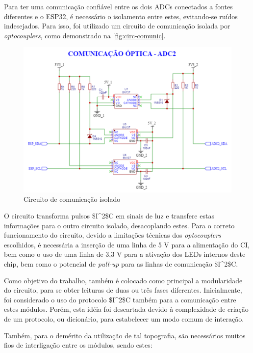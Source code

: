 Para ter uma comunicação confiável entre os dois \gls{ADC}s conectados a fontes diferentes e o ESP32, é necessário o isolamento entre estes, evitando-se ruídos indesejados. Para isso, foi utilizado um circuito de comunicação isolada por \textit{optocouplers}, como demonstrado na \autoref{fig:circ-comunic}.

\begin{figure}[htb!]
    \caption{Circuito de comunicação isolado}
    \label{fig:circ-comunic}
    \includegraphics[width=1.0\textwidth]{figuras/circ-comunic.png}
    \fonte{}
\end{figure}

O circuito transforma pulsos \gls{$I^2$C} em sinais de luz e transfere estas informações para o outro circuito isolado, desacoplando estes. Para o correto funcionamento do circuito, devido a limitações técnicas dos \textit{optocouplers} escolhidos, é necessária a inserção de uma linha de 5 V para a alimentação do \gls{CI}, bem como o uso de uma linha de 3,3 V para a ativação dos LEDs internos deste chip, bem como o potencial de \textit{pull-up} para as linhas de comunicação \gls{$I^2$C}.

Como objetivo do trabalho, também é colocado como principal a modularidade do circuito, para se obter leituras de duas ou três fases diferentes. Inicialmente, foi considerado o uso do protocolo \gls{$I^2$C} também para a comunicação entre estes módulos. Porém, esta idéia foi descartada devido à complexidade de criação de um protocolo, ou dicionário, para estabelecer um modo comum de interação.

Também, para o demérito da utilização de tal topografia, são necessários muitos fios de interligação entre os módulos, sendo estes:

